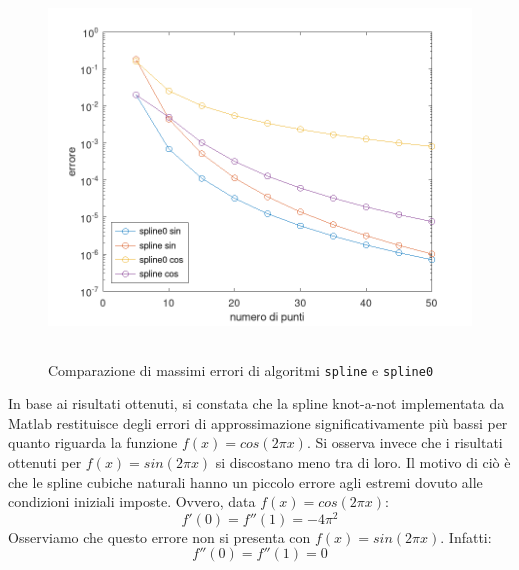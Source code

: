 \FloatBarrier
\begin{figure}[!ht]
    \centering
    \includegraphics[width=16cm,height=10cm,keepaspectratio]{capitolo4/es22_figure.png}
    \caption{Comparazione di massimi errori di algoritmi \lstinline{spline} e \lstinline{spline0}}
    \label{fig:es22}
\end{figure}
\FloatBarrier
In base ai risultati ottenuti, si constata che la spline knot-a-not implementata da
Matlab restituisce degli errori di approssimazione significativamente più bassi
per quanto riguarda la funzione $f(x) = cos(2 \pi x)$. Si osserva invece che i risultati
ottenuti per $f(x) = sin(2 \pi x)$ si discostano meno tra di loro. Il motivo di ciò è
che le spline cubiche naturali hanno un piccolo errore agli estremi dovuto alle
condizioni iniziali imposte. Ovvero, data $f(x) = cos(2 \pi x)$:
\[
    f'(0) = f''(1) = -4 \pi ^2
\]
Osserviamo che questo errore non si presenta con $f(x) = sin(2 \pi x)$. Infatti:
\[
    f''(0) = f''(1) = 0
\]
